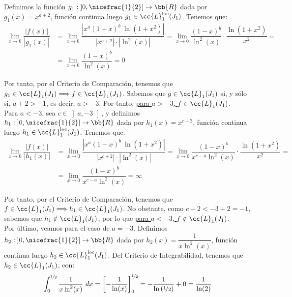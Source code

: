 \begin{ejercicio}
\begin{enumerate}
\begin{itemize}
            Definimos la función $g_1:\left]0,\nicefrac{1}{2}\right]\to \bb{R}$ dada por $g_1(x)=x^{a+2}$, función continua luego $g_1\in \cc{L}_1^{\text{loc}}(J_1)$.
            Tenemos que:
            \begin{align*}
                \lim_{x\to 0} \dfrac{|f(x)|}{|g_1(x)|}
                &= \lim_{x\to 0} \dfrac{|x^a{(1-x)}^b~\ln(1+x^2)|}{|x^{a+2}|\cdot |\ln^2(x)|}
                = \lim_{x\to 0} \dfrac{{(1-x)}^b}{\ln^2(x)}\cdot \dfrac{\ln(1+x^2)}{x^2}
                =\\&= \lim_{x\to 0} \dfrac{{(1-x)}^b}{\ln^2(x)} = 0
            \end{align*}

            Por tanto, por el Criterio de Comparación, tenemos que $g_1\in \cc{L}_1(J_1)\Longrightarrow f\in \cc{L}_1(J_1)$.
            Sabemos que $g\in \cc{L}_1(J_1)$ si, y sólo si, $a+2>-1$, es decir, $a>-3$.
            Por tanto, \ul{para $a>-3$, $f\in \cc{L}_1(J_1)$}.\\

            Para $a<-3$, sea $c\in \left]a, -3\right[$, y definimos $h_1:\left]0,\nicefrac{1}{2}\right]\to \bb{R}$ dada por $h_1(x)=x^{c+2}$, función continua luego $h_1\in \cc{L}_1^{\text{loc}}(J_1)$.
            Tenemos que:
            \begin{align*}
                \lim_{x\to 0} \dfrac{|f(x)|}{|h_1(x)|}
                &= \lim_{x\to 0} \dfrac{|x^a{(1-x)}^b~\ln(1+x^2)|}{|x^{c+2}|\cdot |\ln^2(x)|}
                = \lim_{x\to 0} \dfrac{{(1-x)}^b}{x^{c-a}\ln^2(x)}\cdot \dfrac{\ln(1+x^2)}{x^2}
                =\\&= \lim_{x\to 0} \dfrac{{(1-x)}^b}{x^{c-a}\ln^2(x)}
                = \infty
            \end{align*}

            Por tanto, por el Criterio de Comparación, tenemos que $f\in \cc{L}_1(J_1)\Longrightarrow h_1\in \cc{L}_1(J_1)$.
            No obstante, como $c+2<-3+2=-1$, sabemos que $h_1\notin \cc{L}_1(J_1)$, por lo que \ul{para $a<-3$, $f\notin \cc{L}_1(J_1)$}.\\

            Por último, veamos para el caso de $a=-3$. Definimos $h_2:\left]0,\nicefrac{1}{2}\right]\to \bb{R}$ dada por $h_2(x)=\dfrac{1}{x\ln^2(x)}$, función continua luego $h_2\in \cc{L}_1^{\text{loc}}(J_1)$.
            Del Criterio de Integrabilidad, tenemos que $h_2\in \cc{L}_1(J_1)$, con:
            \begin{equation*}
                \int_0^{\nicefrac{1}{2}} \dfrac{1}{x\ln^2(x)}~dx
                = \left[-\dfrac{1}{\ln(x)}\right]_0^{\nicefrac{1}{2}}
                = -\dfrac{1}{\ln\left(\nicefrac{1}{2}\right)} + 0
                = \dfrac{1}{\ln(2)}
            \end{equation*}


\end{itemize}
\end{enumerate}
\end{ejercicio}
